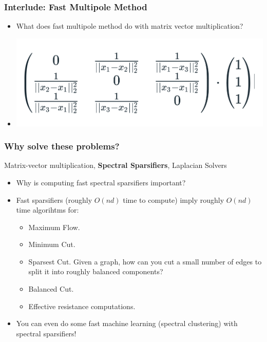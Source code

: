 \begin{frame}
    \frametitle{Interlude: Fast Multipole Method}
    \begin{itemize} 
      \item What does fast multipole method do with matrix vector
        multiplication?
      \item \begin{center}
    \includegraphics[width=1\textwidth]{figs/mv2.png}
        \end{center}

    \end{itemize}
\end{frame}

\begin{frame}
  \frametitle{Why solve these problems?}

  {\color{red}Matrix-vector multiplication}, \textbf{{\color{darkblue}Spectral
  Sparsifiers}}, {\color{darkgreen} Laplacian Solvers}
  \begin{itemize} 
    \item Why is computing fast spectral sparsifiers important?
    \item Fast sparsifiers (roughly $O(nd)$ time to compute) imply
      roughly $O(nd)$ time algorihtms for:
      \begin{itemize}
        \item Maximum Flow.
        \item Minimum Cut.
        \item Sparsest Cut. Given a graph, how can you cut a small
          number of edges to split it into roughly balanced components?
        \item Balanced Cut.
        \item Effective resistance computations. 
      \end{itemize}
    \item You can even do some fast machine learning (spectral
      clustering) with spectral sparsifiers!
  \end{itemize}
\end{frame}

